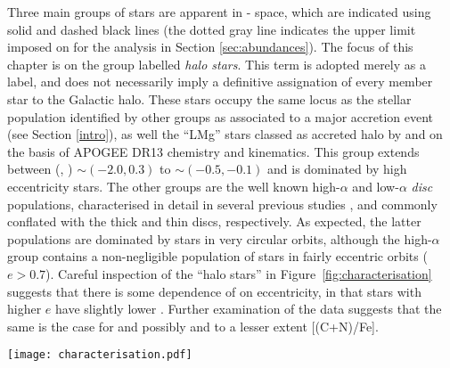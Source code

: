 Three main groups of stars are apparent in \mgfe{}-\feh{} space,
which are indicated using solid and dashed black lines (the
dotted gray line indicates the upper limit imposed on \feh{} for
the analysis in Section \ref{sec:abundances}).  The focus of this
chapter is on the group labelled \textit{halo stars}. This term
is adopted merely as a label, and does not necessarily imply a
definitive assignation of every member star to the Galactic halo.
These stars occupy the same locus as the stellar population
identified by other groups as associated to a major accretion event
(see Section \ref{intro}), as well the ``LMg'' stars classed
as accreted halo by \citet{2018ApJ...852...49H} and
\citet{2018ApJ...852...50F} on the basis of APOGEE DR13 chemistry
and kinematics.  This group extends between (\feh{},
\mgfe{}) $\sim(-2.0, 0.3)$ to $\sim (-0.5, -0.1)$ and is dominated
by high eccentricity stars.  The other groups are the well known
high-$\alpha$ and low-$\alpha$ {\it disc} populations, characterised
in detail in several previous studies
\citep[e.g.][]{2014ApJ...796...38N,2015ApJ...808..132H,2015MNRAS.453.1855M,2017arXiv170600018M},
and commonly conflated with the thick and thin discs, respectively.
As expected, the latter populations are dominated by stars in very
circular orbits, although the high-$\alpha$ group contains a
non-negligible population of stars in fairly eccentric orbits 
($e > 0.7$). Careful inspection of the ``halo stars'' in
Figure~\ref{fig:characterisation} suggests that there is some
dependence of \mgfe{} on eccentricity, in that stars with higher
$e$ have slightly lower \mgfe{}.  Further examination of the data
suggests that the same is the case for \alfe{} and possibly \nife{}
and to a lesser extent [(C+N)/Fe].

\begin{figure*}
\texttt{[image: characterisation.pdf]}
\caption[The \mgfe{}-\feh{} plane for APOGEE DR12 stars, coloured by their orbital eccentricity]{\label{fig:characterisation} The \mgfe{}-\feh{} plane in
APOGEE DR14, coloured by orbital eccentricity $e$, as estimated
using the method of \citet{2018arXiv180202592M}. The points are
plotted with the highest $e$ stars overlaying the points at lower
$e$, such that the highest $e$ populations stand out.  Plotted
also are the mean error bars within \feh{} bins of width 0.5 dex
between -2.5 and -0.5 dex. It is clear that a population extends from
(\feh{},\mgfe{}) $\sim$  (-2.0, 0.3) to $\sim$ (-1.0, 0.1) that
appears to consist mainly of stars on highly eccentric orbits, with
a distinct element abundance pattern to that of the Galactic disc
(at \feh{}$>-0.7$). The dotted gray line reflects the cut in \feh{}
which is imposed to perform the $k$-means analysis.}
\end{figure*}


